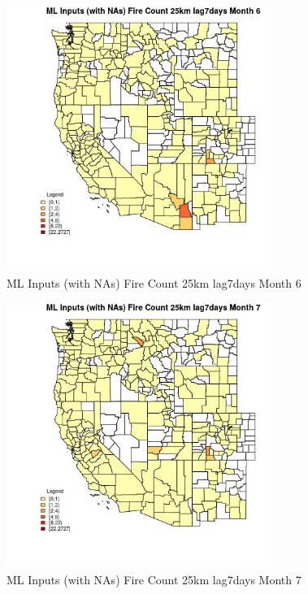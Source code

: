 \begin{figure} 
\centering  
\includegraphics[width=0.77\textwidth]{Code_Outputs/Report_ML_input_PM25_Step4_part_f_de_duplicated_aves_prioritize_24hr_obswNAs_CountyFire_Count_25km_lag7daysmedianMonth6.jpg} 
\caption{\label{fig:Report_ML_input_PM25_Step4_part_f_de_duplicated_aves_prioritize_24hr_obswNAsCountyFire_Count_25km_lag7daysmedianMonth6}ML Inputs (with NAs) Fire Count 25km lag7days Month 6} 
\end{figure} 
 

\begin{figure} 
\centering  
\includegraphics[width=0.77\textwidth]{Code_Outputs/Report_ML_input_PM25_Step4_part_f_de_duplicated_aves_prioritize_24hr_obswNAs_CountyFire_Count_25km_lag7daysmedianMonth7.jpg} 
\caption{\label{fig:Report_ML_input_PM25_Step4_part_f_de_duplicated_aves_prioritize_24hr_obswNAsCountyFire_Count_25km_lag7daysmedianMonth7}ML Inputs (with NAs) Fire Count 25km lag7days Month 7} 
\end{figure} 
 

